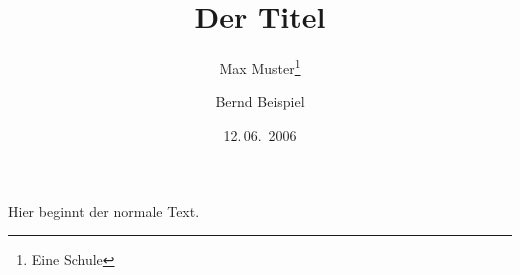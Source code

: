 \documentclass[a5paper,titlepage,twoside]{scrreprt}
\begin{document}
\extratitle{Schmutztitel}
\titlehead{Titelkopf} 
\subject{Typisierung}
\title{Der Titel}
\author{Max Muster\thanks{Eine Schule} \and Bernd Beispiel}
\date{12.\,06.~2006}
\publishers{Uni Universal}
\uppertitleback{Uppertitleback}
\dedication{Widmung}

\maketitle[-1]

Hier beginnt der normale Text.
\end{document}

